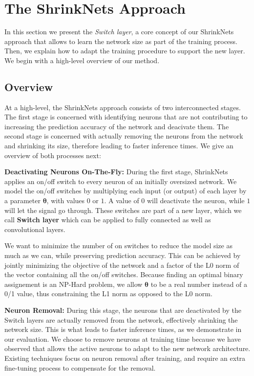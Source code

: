 \section{The ShrinkNets Approach}

In this section we present the \emph{Switch layer}, a core concept of our
ShrinkNets approach that allows to learn the network size as part of the
training process. Then, we explain how to adapt the training procedure to
support the new layer. We begin with a high-level overview of our method.

\subsection{Overview}

At a high-level, the ShrinkNets approach consists of two interconnected stages.
The first stage is concerned with identifying neurons that are not contributing
to increasing the prediction accuracy of the network and deacivate them. The
second stage is concerned with actually removing the neurons from the network
and shrinking its size, therefore leading to faster inference times. We give an
overview of both processes next:

\noindent\textbf{Deactivating Neurons On-The-Fly: }During the first stage,
ShrinkNets applies an on/off switch to every neuron of an initially oversized
network. We model the on/off switches by multiplying each input (or output) of
each layer by a parameter $\bm{\theta}$, with values $0$ or $1$. A value of $0$
will deactivate the neuron, while $1$ will let the signal go through. These
switches are part of a new layer, which we call \textbf{Switch layer} which can
be applied to fully connected as well as convolutional layers.

We want to minimize the number of on switches to reduce the model size as much
as we can, while preserving prediction accuracy. This can be achieved by jointly
minimizing the objective of the network and a factor of the L0 norm of the
vector containing all the on/off switches. Because finding an optimal binary
assignement is an NP-Hard problem, we allow $\bm{\theta}$ to be a real number
instead of a 0/1 value, thus constraining the L1 norm as opposed to the L0 norm.

\noindent\textbf{Neuron Removal: } During this stage, the neurons that are
deactivated by the Switch layers are actually removed from the network,
effectively shrinking the network size. This is what leads to faster inference
times, as we demonstrate in our evaluation. We choose to remove neurons at
training time because we have observed that allows the active neurons to adapt
to the new network architecture. Existing techniques focus on neuron removal
after training, and require an extra fine-tuning process to compensate for the
removal.

